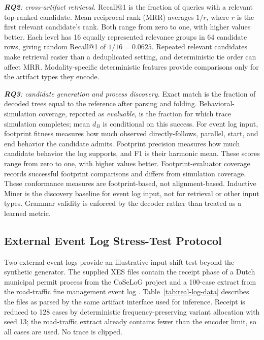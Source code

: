 \documentclass[mathematics,article,submit,moreauthors]{Definitions/mdpi}
\newcommand{\RQtwo}{\textbf{RQ2}}
\newcommand{\RQthree}{\textbf{RQ3}}
\begin{document}
\emph{\RQtwo: cross-artifact retrieval.} Recall@1 is the fraction of queries with a relevant top-ranked candidate. Mean reciprocal rank (MRR) averages $1/r$, where $r$ is the first relevant candidate's rank. Both range from zero to one, with higher values better. Each level has 16 equally represented relevance groups in 64 candidate rows, giving random Recall@1 of $1/16=0.0625$. Repeated relevant candidates make retrieval easier than a deduplicated setting, and deterministic tie order can affect MRR. Modality-specific deterministic features provide comparisons only for the artifact types they encode.

\emph{\RQthree: candidate generation and process discovery.} Exact match is the fraction of decoded trees equal to the reference after parsing and folding. Behavioral-simulation coverage, reported as \emph{evaluable}, is the fraction for which trace simulation completes; mean $d_B$ is conditional on this success. For event log input, footprint fitness measures how much observed directly-follows, parallel, start, and end behavior the candidate admits. Footprint precision measures how much candidate behavior the log supports, and F1 is their harmonic mean. These scores range from zero to one, with higher values better. Footprint-evaluator coverage records successful footprint comparisons and differs from simulation coverage. These conformance measures are footprint-based, not alignment-based. Inductive Miner is the discovery baseline for event log input, not for retrieval or other input types. Grammar validity is enforced by the decoder rather than treated as a learned metric.

\subsection{External Event Log Stress-Test Protocol}\label{sec:real-log-design}

Two external event logs provide an illustrative input-shift test beyond the synthetic generator. The supplied XES files contain the receipt phase of a Dutch municipal permit process from the CoSeLoG project \cite{Buijs2014Receipt} and a 100-case extract from the road-traffic fine management event log \cite{DeLeoni2015RoadTraffic}. Table~\ref{tab:real-log-data} describes the files as parsed by the same artifact interface used for inference. Receipt is reduced to 128 cases by deterministic frequency-preserving variant allocation with seed 13; the road-traffic extract already contains fewer than the encoder limit, so all cases are used. No trace is clipped.
\end{document}
